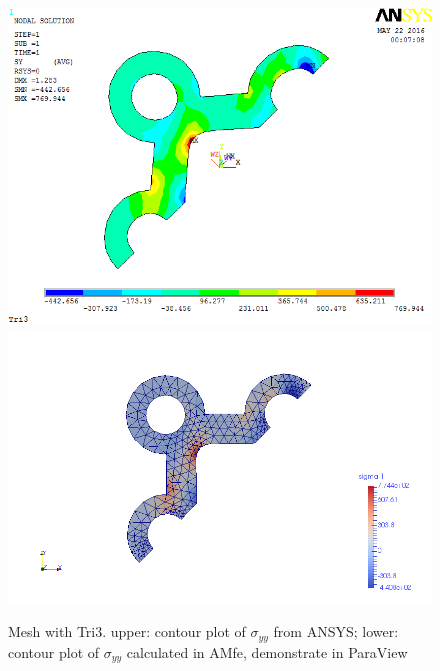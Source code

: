 \begin{figure}[htbp]
	\begin{center}
		\includegraphics[width=13cm,clip]{TTri3_Syy.png} 		
		\includegraphics[width=13cm,clip]{TTri3_Syy_P.png} 		
		\caption{Mesh with Tri3. upper: contour plot of $\sigma_{yy}$ from ANSYS; lower: contour plot of $\sigma_{yy}$ calculated in AMfe, demonstrate in ParaView} \label{fig: Tri3_Syy}
	\end{center}
\end{figure}
\clearpage 

